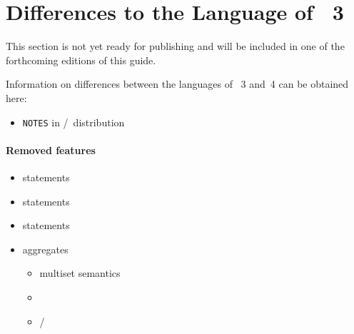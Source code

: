 \section{Differences to the Language of \gringo~3}\label{sec:gringo:tri}

This section is not yet ready for publishing
and will be included in one of the forthcoming editions of this guide.

Information on differences between the languages of \gringo~3 and~4 can be obtained here:
\begin{itemize}
\item \texttt{NOTES} in \gringo/\clingo\ distribution
\end{itemize}

\paragraph{Removed features}
\begin{itemize}
\item {}    statements
\item {}  statements
\item {} statements
\item aggregates
  \begin{itemize}
  \item multiset semantics
  \item {} 
  \item {}/
  \end{itemize}
\end{itemize}

